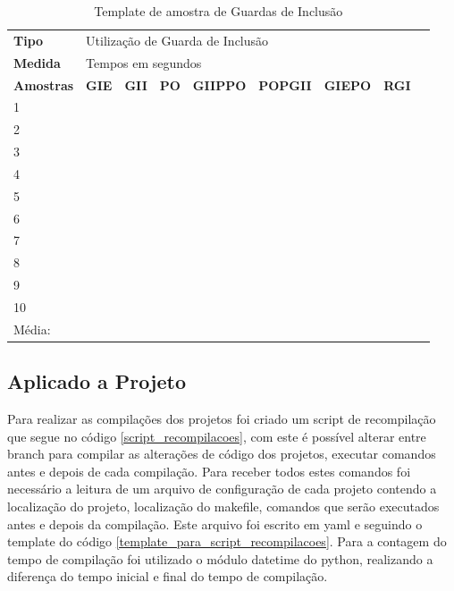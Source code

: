 \begin{table}[!ht]
\centering
\caption{Template de amostra de Guardas de Inclusão}
\label{tab:modelo_guards}
\begin{tiny}
\begin{tabular}{lp{1cm}p{1cm}p{1cm}p{1cm}p{1cm}p{1cm}p{1cm}p{1cm}}
\toprule
\textbf{Tipo} & \multicolumn{7}{l}{Utilização de Guarda de Inclusão} \\
\textbf{Medida} & \multicolumn{7}{l}{Tempos em segundos } \\
\textbf{Amostras} & \textbf{GIE} & \textbf{GII} & \textbf{PO} & 
\textbf{GIIPPO} & \textbf{POPGII} & \textbf{GIEPO} & \textbf{RGI} \\ \midrule
 1  &  &  &   &   &   &   &  \\ \midrule
 2  &  &  &   &   &   &   &  \\ \midrule
 3  &  &  &   &   &   &   &  \\ \midrule
 4  &  &  &   &   &   &   &  \\ \midrule
 5  &  &  &   &   &   &   &  \\ \midrule
 6  &  &  &   &   &   &   &  \\ \midrule
 7  &  &  &   &   &   &   &  \\ \midrule 
 8  &  &  &   &   &   &   &  \\ \midrule
 9  &  &  &   &   &   &   &  \\ \midrule
 10 &  &  &   &   &   &   &  \\ \midrule
 Média: & & & & &   &   &    \\ \bottomrule
\end{tabular}
\end{tiny}
\end{table}


\subsection{Aplicado a Projeto}

Para realizar as compilações dos projetos foi criado um script de recompilação que
 segue no código \ref{script_recompilacoes}, com este é possível alterar entre
 branch para compilar as alterações de código dos projetos,
 executar comandos antes e depois de cada compilação.
 Para receber todos estes comandos foi necessário a leitura de um arquivo de
 configuração de cada projeto contendo a localização do projeto,
 localização do makefile, comandos que serão executados antes e depois
 da compilação.
 Este arquivo foi escrito em yaml e seguindo o template do código
 \ref{template_para_script_recompilacoes}.
Para a contagem do tempo de compilação foi utilizado o módulo datetime do python,
 realizando a diferença do tempo inicial e final do tempo de compilação.

